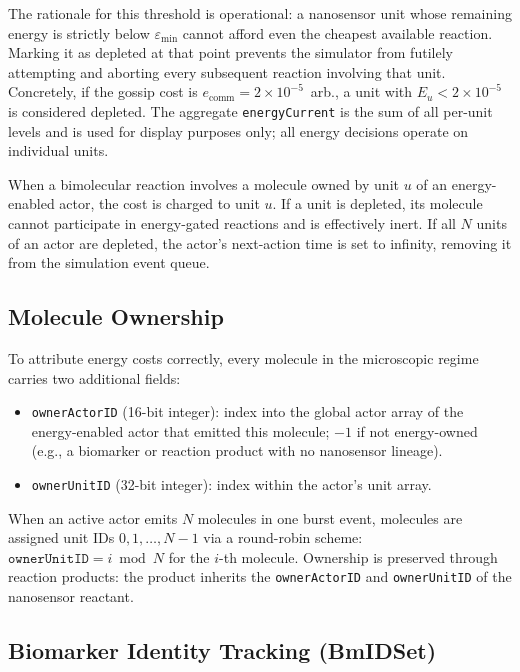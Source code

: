 \documentclass[journal]{IEEEtran}
\begin{document}
The rationale for this threshold is operational: a nanosensor unit whose
remaining energy is strictly below $\varepsilon_\mathrm{min}$ cannot afford
even the cheapest available reaction. Marking it as depleted at that point
prevents the simulator from futilely attempting and aborting every
subsequent reaction involving that unit. Concretely, if the gossip cost is
$e_\mathrm{comm} = 2\times10^{-5}$~arb., a unit with $E_u < 2\times10^{-5}$
is considered depleted. The aggregate \texttt{energyCurrent} is the sum of
all per-unit levels and is used for display purposes only; all energy decisions
operate on individual units.

When a bimolecular reaction involves a molecule owned by unit $u$ of an
energy-enabled actor, the cost is charged to unit $u$. If a unit is depleted,
its molecule cannot participate in energy-gated reactions and is effectively
inert. If all $N$ units of an actor are depleted, the actor's next-action
time is set to infinity, removing it from the simulation event queue.

\subsection{Molecule Ownership}

To attribute energy costs correctly, every molecule in the microscopic regime
carries two additional fields:
\begin{itemize}
  \item \texttt{ownerActorID} (16-bit integer): index into the global actor
        array of the energy-enabled actor that emitted this molecule; $-1$ if
        not energy-owned (e.g., a biomarker or reaction product with no
        nanosensor lineage).
  \item \texttt{ownerUnitID} (32-bit integer): index within the actor's unit
        array.
\end{itemize}
When an active actor emits $N$ molecules in one burst event, molecules are
assigned unit IDs $0, 1, \ldots, N-1$ via a round-robin scheme:
$\texttt{ownerUnitID} = i \bmod N$ for the $i$-th molecule. Ownership is
preserved through reaction products: the product inherits the
\texttt{ownerActorID} and \texttt{ownerUnitID} of the nanosensor reactant.

\subsection{Biomarker Identity Tracking (BmIDSet)}
\end{document}
